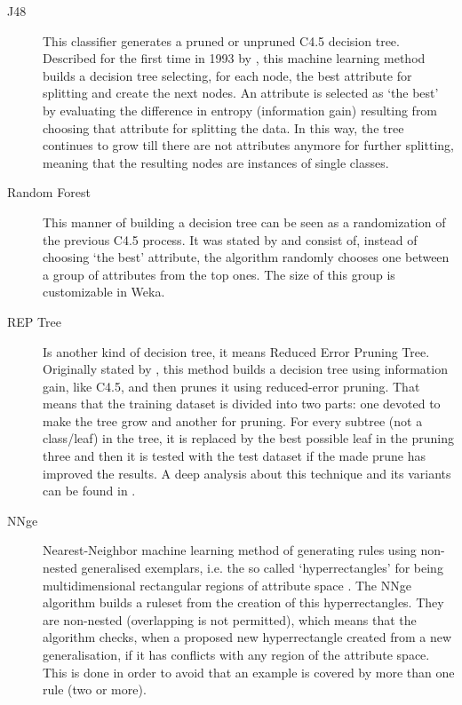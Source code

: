 \documentclass{llncs}
\begin{document}
\begin{description}


 \item[J48] This classifier generates a pruned or unpruned C4.5 decision tree. Described for the first time in 1993 by \cite{Quinlan1993}, this machine learning method builds a decision tree selecting, for each node, the best attribute for splitting and create the next nodes. An attribute is selected as `the best' by evaluating the difference in entropy (information gain) resulting from choosing that attribute for splitting the data. In this way, the tree continues to grow till there are not attributes anymore for further splitting, meaning that the resulting nodes are instances of single classes.


\item[Random Forest] This manner of building a decision tree can be seen as a randomization of the previous C4.5 process. It was stated by \cite{Breiman2001} and consist of, instead of choosing `the best' attribute, the algorithm randomly chooses one between a group of attributes from the top ones. The size of this group is customizable in Weka.

\item[REP Tree] Is another kind of decision tree, it means Reduced Error Pruning Tree. Originally stated by \cite{Quinlan1987}, this method builds a decision tree using information gain, like C4.5, and then prunes it using reduced-error pruning. That means that the training dataset is divided into  two parts: one devoted to make the tree grow and another for pruning. For every subtree (not a class/leaf) in the tree, it is replaced by the best possible leaf in the pruning three and then it is tested with the test dataset if the made prune has improved the results. A deep analysis about this technique and its variants can be found in \cite{Elomaa2001}.

\item[NNge] Nearest-Neighbor machine learning method of generating rules using non-nested generalised exemplars, i.e. the so called `hyperrectangles' for being multidimensional rectangular regions of attribute space \cite{Martin1995}. The NNge algorithm builds a ruleset from the creation of this hyperrectangles. They are non-nested (overlapping is not permitted), which means that the algorithm checks, when a proposed new hyperrectangle created from a new generalisation, if it has conflicts with any region of the attribute space. This is done in order to avoid that an example is covered by more than one rule (two or more).


\end{description}
\end{document}
